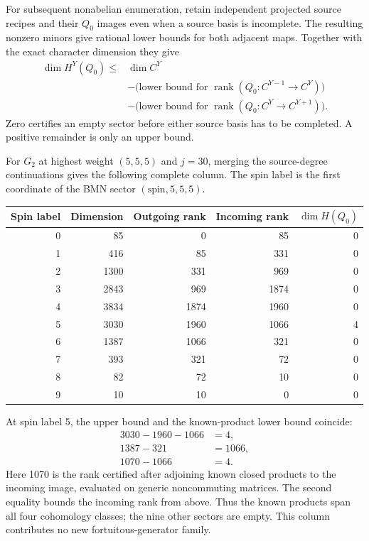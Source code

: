 \documentclass[11pt]{article}
\numberwithin{equation}{section}
\numberwithin{figure}{section}
\numberwithin{table}{section}
\begin{document}
For subsequent nonabelian enumeration, retain independent projected source recipes and their $Q_0$ images even when a source basis is incomplete. The resulting nonzero minors give rational lower bounds for both adjacent maps. Together with the exact character dimension they give
\begin{equation*}
\begin{aligned}
\dim H^Y(Q_0)\leq {}&\dim C^Y\\
&-\bigl(\text{lower bound for }\operatorname{rank}(Q_0:C^{Y-1}\to C^Y)\bigr)\\
&-\bigl(\text{lower bound for }\operatorname{rank}(Q_0:C^Y\to C^{Y+1})\bigr).
\end{aligned}
\end{equation*}
Zero certifies an empty sector before either source basis has to be completed. A positive remainder is only an upper bound.

For $G_2$ at highest weight $(5,5,5)$ and $j=30$, merging the source-degree continuations gives the following complete column. The spin label is the first coordinate of the BMN sector $(\mathrm{spin},5,5,5)$.
\begin{center}
\small
\begin{tabular}{@{}rrrrr@{}}
\toprule
Spin label & Dimension & Outgoing rank & Incoming rank & $\dim H(Q_0)$\\
\midrule
0 & 85 & 0 & 85 & 0\\
1 & 416 & 85 & 331 & 0\\
2 & 1300 & 331 & 969 & 0\\
3 & 2843 & 969 & 1874 & 0\\
4 & 3834 & 1874 & 1960 & 0\\
5 & 3030 & 1960 & 1066 & 4\\
6 & 1387 & 1066 & 321 & 0\\
7 & 393 & 321 & 72 & 0\\
8 & 82 & 72 & 10 & 0\\
9 & 10 & 10 & 0 & 0\\
\bottomrule
\end{tabular}
\end{center}
At spin label 5, the upper bound and the known-product lower bound coincide:
\begin{equation*}
\begin{aligned}
3030-1960-1066&=4,\\
1387-321&=1066,\\
1070-1066&=4.
\end{aligned}
\end{equation*}
Here 1070 is the rank certified after adjoining known closed products to the incoming image, evaluated on generic noncommuting matrices. The second equality bounds the incoming rank from above. Thus the known products span all four cohomology classes; the nine other sectors are empty. This column contributes no new fortuitous-generator family.
\end{document}

